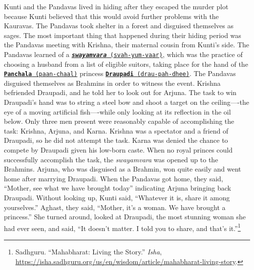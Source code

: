 \documentclass[10pt, letterpaper]{article}
\begin{document}
Kunti and the Pandavas lived in hiding after they escaped the murder
plot because Kunti believed that this would avoid further problems with
the Kauravas. The Pandavas took shelter in a forest and disguised
themselves as sages. The most important thing that happened during their
hiding period was the Pandavas meeting with Krishna, their maternal
cousin from Kunti's side. The Pandavas learned of a
\texttt{\underline{\href{https://drive.google.com/file/d/1LqbjDj6XmSM0e6Dyczf_hlx1PbWlZvaz/view?usp=sharing}{\emph{\textbf{swayamvara}}}
(svah-yum-vaar)}}, which was the practice of choosing a husband from a
list of eligible suitors, taking place for the hand of the
\texttt{\underline{\href{https://drive.google.com/file/d/1b7BXHC6ILJ7fihWaZi2QrmjnxZ-L9DzW/view?usp=sharing}{\textbf{Panchala}}
(paan-chaal)}} princess
\texttt{\underline{\href{https://drive.google.com/file/d/1poLMqFJ6fA-zwtX8SJnOBjxyjH_-FblM/view?usp=sharing}{\textbf{Draupadi}}
(drau-pah-dhee)}}. The Pandavas disguised themselves as Brahmins in order
to witness the event. Krishna befriended Draupadi, and he told her to
look out for Arjuna. The task to win Draupadi's hand was to string a
steel bow and shoot a target on the ceiling----the eye of a moving
artificial fish----while only looking at its reflection in the oil
below. Only three men present were reasonably capable of accomplishing
the task: Krishna, Arjuna, and Karna. Krishna was a spectator and a
friend of Draupadi, so he did not attempt the task. Karna was denied the
chance to compete by Draupadi given his low-born caste. When no royal
princes could successfully accomplish the task, the \emph{swayamvara}
was opened up to the Brahmins. Arjuna, who was disguised as a Brahmin,
won quite easily and went home after marrying Draupadi. When the
Pandavas got home, they said, ``Mother, see what we have brought today''
indicating Arjuna bringing back Draupadi. Without looking up, Kunti
said, ``Whatever it is, share it among yourselves.'' Aghast, they said,
``Mother, it's a woman. We have brought a princess.'' She turned around,
looked at Draupadi, the most stunning woman she had ever seen, and said,
``It doesn't matter. I told you to share, and that's it.''\footnote{Sadhguru.
  ``Mahabharat: Living the Story.'' \emph{Isha},
  \href{https://isha.sadhguru.org/us/en/wisdom/article/mahabharat-living-story}{\underline{https://isha.sadhguru.org/us/en/wisdom/article/mahabharat-living-story}}.} \\
\end{document}
